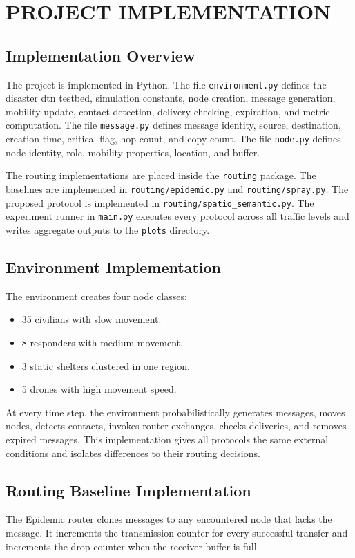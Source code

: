 \chapter{\MakeUppercase{Project Implementation}}
\section{Implementation Overview}
The project is implemented in Python. The file \verb|environment.py| defines the disaster \ac{dtn} testbed, simulation constants, node creation, message generation, mobility update, contact detection, delivery checking, expiration, and metric computation. The file \verb|message.py| defines message identity, source, destination, creation time, critical flag, hop count, and copy count. The file \verb|node.py| defines node identity, role, mobility properties, location, and buffer.

The routing implementations are placed inside the \verb|routing| package. The baselines are implemented in \verb|routing/epidemic.py| and \verb|routing/spray.py|. The proposed protocol is implemented in \verb|routing/spatio_semantic.py|. The experiment runner in \verb|main.py| executes every protocol across all traffic levels and writes aggregate outputs to the \verb|plots| directory.

\section{Environment Implementation}
The environment creates four node classes:

\begin{itemize}
	\item 35 civilians with slow movement.
	\item 8 responders with medium movement.
	\item 3 static shelters clustered in one region.
	\item 5 drones with high movement speed.
\end{itemize}

At every time step, the environment probabilistically generates messages, moves nodes, detects contacts, invokes router exchanges, checks deliveries, and removes expired messages. This implementation gives all protocols the same external conditions and isolates differences to their routing decisions.

\section{Routing Baseline Implementation}
The Epidemic router clones messages to any encountered node that lacks the message. It increments the transmission counter for every successful transfer and increments the drop counter when the receiver buffer is full.

